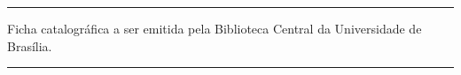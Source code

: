 \begin{fichacatalografica}
  \vspace*{\fill}
  \hrule
  \begin{center}
    \begin{minipage}[c]{12.5cm}
      Ficha catalográfica a ser emitida pela Biblioteca Central da Universidade de Brasília.
    \end{minipage}
  \end{center}
  \hrule
\end{fichacatalografica}
